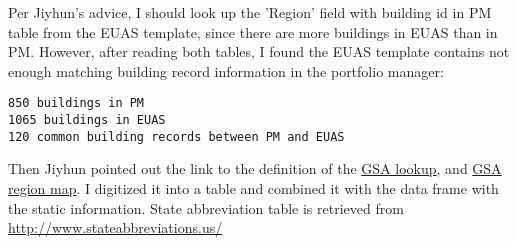 \documentclass[12pt]{article}
\begin{document}
Per Jiyhun's advice, I should look up the 'Region' field with building
id in PM table from the EUAS template, since there are more buildings
in EUAS than in PM. However, after reading both tables, I found the
EUAS template contains not enough matching building record information
in the portfolio manager:
\begin{verbatim}
850 buildings in PM
1065 buildings in EUAS
120 common building records between PM and EUAS
\end{verbatim}

Then Jiyhun pointed out the link to the definition of the
\href{http://www.gsa.gov/portal/category/22227}{GSA lookup}, and
\href{http://www.gsa.gov/graphics/pbs/RWAmap.pdf}{GSA region map}. I
digitized it into a table and combined it with the data frame with the
static information. State abbreviation table is retrieved from
\url{http://www.stateabbreviations.us/}
\end{document}
